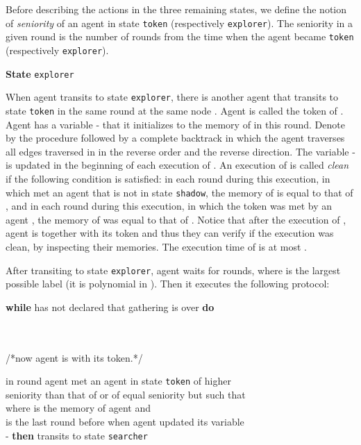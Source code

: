 \documentclass[11pt]{article}
\begin{document}
 Before describing the actions in the three remaining states, we define the notion of {\em seniority} of an agent in state {\tt token} (respectively {\tt explorer}).
The seniority in a given round is the number of rounds from the time when the agent became {\tt token} (respectively {\tt explorer}).

 \vspace*{0.2cm}
 
  \noindent
 {\bf State} {\tt explorer}
 
 When agent  transits to state {\tt explorer}, there is another agent  that transits to state  {\tt token} in the same round at the same node .
 Agent  is called the token of . Agent  has a variable - that it initializes to the memory of  in this round. 
 Denote by  the procedure   followed by a complete backtrack  in which the agent traverses all edges traversed
in   in the reverse order and the reverse direction. The variable - is updated in the beginning of each execution of .
 An execution of   is called {\em clean} if 
the following condition is satisfied: in each round  during this execution, in which  met an agent  {that is not in state {\tt shadow}}, the memory of  is equal to that of ,
and in each round during this execution, in which the token  was met by an agent , the memory of  was equal to that of . Notice that 
after the execution of  , agent  is together with its token  and thus they can verify if the execution was clean, by inspecting their memories.
The execution time of  is at most .



 
 
 After transiting to state {\tt explorer}, agent  waits for { rounds}, where  is the largest possible label (it is 
 polynomial in ). 
 Then it executes the following protocol:
\newpage
 
  \vspace*{0.2cm}
  \noindent
 {\bf while}  has not declared that gathering is over {\bf do}
 
 \noindent
  \hspace*{0.5cm}{\bf do}\\
   \noindent
 \hspace*{1cm}\\
  \noindent
  \hspace*{1cm}/*now agent  is with its token.*/
 
 \vspace*{0.2cm}
  \noindent
  \hspace*{1cm}{\bf if} {in round } agent  met an agent  in state {\tt token} of higher\\
   \noindent
  \hspace*{1cm}seniority than that of  or of equal seniority but such
  that \\ 
   \noindent
   \hspace*{1cm} where  is the memory of agent  and\\
    \noindent 
    \hspace*{1cm} is the last round {before }
    when agent  updated its variable \\
    \noindent 
    \hspace*{1cm}- {\bf then}  transits to state {\tt searcher}
    
\end{document}
